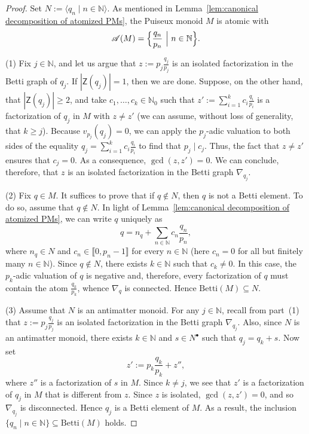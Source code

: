 \documentclass[12pt]{amsart}
\theoremstyle{definition}
\numberwithin{equation}{section}
\newcommand{\nn}{\mathbb{N}}
\providecommand\ldb{\llbracket}
\providecommand\rdb{\rrbracket}
\begin{document}
\begin{proof}
	Set $N := \langle q_n \mid n \in \nn \rangle$. As mentioned in Lemma~\ref{lem:canonical decomposition of atomized PMs}, the Puiseux monoid $M$ is atomic with
	\[
		\mathcal{A}(M) = \Big\{ \frac{q_n}{p_n} \ \Big{|} \ n \in \nn \Big\}.
	\]
	
	(1) Fix $j \in \nn$, and let us argue that $z:= p_j \frac{q_j}{p_j}$ is an isolated factorization in the Betti graph of $q_j$. If $|\mathsf{Z}(q_j)| = 1$, then we are done. Suppose, on the other hand, that $|\mathsf{Z}(q_j)| \ge 2$, and take $c_1, \dots, c_k \in \nn_0$ such that $z' := \sum_{i=1}^k c_i \frac{q_i}{p_i}$ is a factorization of $q_j$ in $M$ with $z \neq z'$ (we can assume, without loss of generality, that $k \ge j$). Because $v_{p_j}(q_j) = 0$, we can apply the $p_j$-adic valuation to both sides of the equality $q_j = \sum_{i=1}^k c_i \frac{q_i}{p_i}$ to find that $p_j \mid c_j$. Thus, the fact that $z \neq z'$ ensures that $c_j = 0$. As a consequence, $\gcd(z,z') = 0$. We can conclude, therefore, that $z$ is an isolated factorization in the Betti graph $\nabla_{q_j}$.
	\smallskip
	
	(2) Fix $q \in M$. It suffices to prove that if $q \notin N$, then $q$ is not a Betti element. To do so, assume that $q \notin N$. In light of Lemma~\ref{lem:canonical decomposition of atomized PMs}, we can write $q$ uniquely as
	\[
		q = n_q + \sum_{n \in \nn} c_n \frac{q_n}{p_n},
	\]
	where $n_q \in N$ and $c_n \in \ldb 0, p_n - 1 \rdb$ for every $n \in \nn$ (here $c_n = 0$ for all but finitely many $n \in \nn$). Since $q \notin N$, there exists $k \in \nn$ such that $c_k \neq 0$. In this case, the $p_k$-adic valuation of $q$ is negative and, therefore, every factorization of $q$ must contain the atom $\frac{q_k}{p_k}$, whence $\nabla_q$ is connected. Hence $\text{Betti}(M) \subseteq N$.
	\smallskip
	
	(3) Assume that $N$ is an antimatter monoid. For any $j \in \mathbb{N}$, recall from part~(1) that $z:=p_j\frac{q_j}{p_j}$ is an isolated factorization in the Betti graph $\nabla_{q_j}$. Also, since $N$ is an antimatter monoid, there exists $k \in \mathbb{N}$ and $s \in N^\bullet$ such that $q_j = q_k + s$. Now set
	\[
		z' := p_k \frac{q_k}{p_k} + z'',
	\]
	where $z''$ is a factorization of $s$ in $M$. Since $k \neq j$, we see that $z'$ is a factorization of $q_j$ in $M$ that is different from $z$. Since $z$ is isolated, $\gcd(z,z') = 0$, and so $\nabla_{q_j}$ is disconnected. Hence $q_j$ is a Betti element of $M$. As a result, the inclusion $\{q_n \mid n \in \mathbb{N}\} \subseteq \text{Betti}(M)$ holds.
	\smallskip
	

\end{proof}
\end{document}
